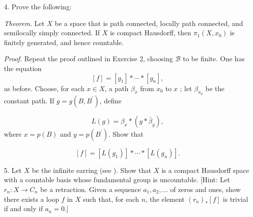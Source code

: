 4. Prove the following:

\textsl{Theorem.}
	Let \(X\) be a space that is path connected, locally path connected, and semilocally simply connected. If \(X\) is compact Hausdorff, then \({\pi }_{1}( {X,x_{0}})\) is finitely generated, and hence countable.

\textsl{Proof.}
	Repeat the proof outlined in Exercise 2, choosing \(\mathcal{B}\) to be finite. One has the equation
\[
[ f] = [ g_{1}] * \cdots * [ g_{n}] ,
\]
as before. Choose, for each \(x \in X\), a path \({\beta }_{x}\) from \(x_{0}\) to \(x\) ; let \({\beta }_{x_{0}}\) be the constant path. If \(g = g( {B,B^{\prime }})\), define

\[
L( g) = {\beta }_{x} * ( {g * \bar{\beta }_{y}}),
\]
where \(x = p( B)\) and \(y = p( B^{\prime })\). Show that

\[
[ f] = [ {L( g_{1}) }] * \cdots * [ {L( g_{n}) }] .
\]

5. Let \(X\) be the infinite earring (see ). Show that \(X\) is a compact Hausdorff space with a countable basis whose fundamental group is uncountable. [Hint: Let \(r_{n} : X \rightarrow {C}_{n}\) be a retraction. Given a sequence \(a_{1},a_{2},\ldots\) of zeros and ones, show there exists a loop \(f\) in \(X\) such that, for each \(n\), the element \({( r_{n}) }_{ * }[ f]\) is trivial if and only if \(a_{n} = 0\).]